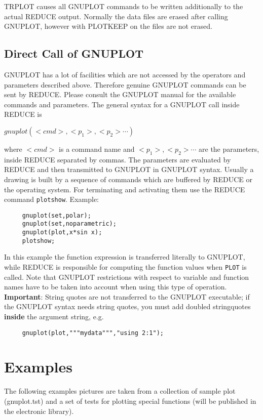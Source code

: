 TRPLOT causes all GNUPLOT commands
to be written additionally to the actual
{\small REDUCE} output. Normally the data files are
erased after calling GNUPLOT, however with PLOTKEEP on
the files are not erased.

\subsection{Direct Call of GNUPLOT}

GNUPLOT has a lot of facilities which are not accessed by
the operators and parameters described above. Therefore
genuine GNUPLOT commands can be sent by {\small REDUCE}.
Please consult the GNUPLOT manual for the available
commands and parameters. The general syntax for a GNUPLOT call
inside {\small REDUCE} is

    $gnuplot(<cmd>,<p_1>,<p_2> \cdots)$

where $<cmd>$ is a command name and $<p_1>,<p_2> \cdots$
are the parameters, inside {\small REDUCE} separated by
commas. The parameters are evaluated by
{\small REDUCE} and then transmitted to GNUPLOT in
GNUPLOT syntax. Usually a drawing is built by a
sequence of commands which are buffered 
by {\small REDUCE} or the operating
system. For terminating and activating them use the {\small REDUCE}
command \verb+plotshow+. Example:
\begin{verbatim}
     gnuplot(set,polar);
     gnuplot(set,noparametric);
     gnuplot(plot,x*sin x);
     plotshow;
\end{verbatim}
In this example the function expression is transferred literally
to GNUPLOT, while {\small REDUCE}
is responsible for computing the function values when \verb+PLOT+ is called.
Note that GNUPLOT restrictions with respect to variable
and function names have to be taken into account when
using this type of operation. {\bf Important}: String quotes are
not transferred to the GNUPLOT executable; if the GNUPLOT syntax
needs string quotes, you must add doubled stringquotes  {\bf inside}
the argument string, e.g.
\begin{verbatim}
     gnuplot(plot,"""mydata""","using 2:1");
\end{verbatim}

\section{Examples}

The following examples pictures are taken from a collection of sample
plot (gnuplot.tst) and a set of tests for plotting special functions
(will be published in the {\REDUCE} electronic library).


